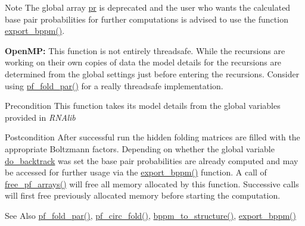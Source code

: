 \begin{DoxyNote}{Note}
The global array \hyperlink{fold__vars_8h_ac98ec419070aee6831b44e5c700f090f}{pr} is deprecated and the user who wants the calculated base pair probabilities for further computations is advised to use the function \hyperlink{group__pf__fold_gac5ac7ee281aae1c5cc5898a841178073}{export\-\_\-bppm()}. 

{\bfseries Open\-M\-P\-:} This function is not entirely threadsafe. While the recursions are working on their own copies of data the model details for the recursions are determined from the global settings just before entering the recursions. Consider using \hyperlink{group__pf__fold_gac4f95bee734b2563a3d6e9932117ebdf}{pf\-\_\-fold\-\_\-par()} for a really threadsafe implementation. 
\end{DoxyNote}
\begin{DoxyPrecond}{Precondition}
This function takes its model details from the global variables provided in {\itshape R\-N\-Alib} 
\end{DoxyPrecond}
\begin{DoxyPostcond}{Postcondition}
After successful run the hidden folding matrices are filled with the appropriate Boltzmann factors. Depending on whether the global variable \hyperlink{group__model__details_gad512b5dd4dbec60faccfe137bb474489}{do\-\_\-backtrack} was set the base pair probabilities are already computed and may be accessed for further usage via the \hyperlink{group__pf__fold_gac5ac7ee281aae1c5cc5898a841178073}{export\-\_\-bppm()} function. A call of \hyperlink{group__pf__fold_gae73db3f49a94f0f72e067ecd12681dbd}{free\-\_\-pf\-\_\-arrays()} will free all memory allocated by this function. Successive calls will first free previously allocated memory before starting the computation. 
\end{DoxyPostcond}
\begin{DoxySeeAlso}{See Also}
\hyperlink{group__pf__fold_gac4f95bee734b2563a3d6e9932117ebdf}{pf\-\_\-fold\-\_\-par()}, \hyperlink{group__pf__fold_ga819ce5fca8984004ac81c4a3b04cb735}{pf\-\_\-circ\-\_\-fold()}, \hyperlink{group__struct__utils_ga129d81c4a1ead793c5b2311333e03dfa}{bppm\-\_\-to\-\_\-structure()}, \hyperlink{group__pf__fold_gac5ac7ee281aae1c5cc5898a841178073}{export\-\_\-bppm()} 
\end{DoxySeeAlso}

